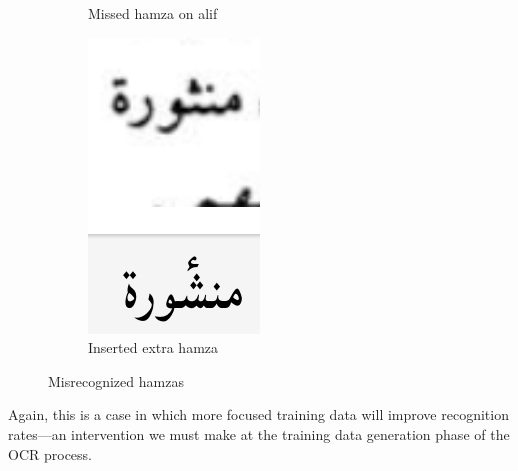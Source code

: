 \begin{figure}[!ht]
\begin{subfigure}[b]{0.3\linewidth}
	\caption{Missed hamza on alif}
	\label{fig3:fig19}
	\end{subfigure}
	\begin{subfigure}[b]{0.3\linewidth}
	\centering
	\includegraphics[width=\textwidth]{images/image30.png}
	\caption{Inserted extra hamza}
	\label{fig3:fig20}
	\end{subfigure}
	\caption{Misrecognized hamzas}
	\label{fig3:fig1820}
\end{figure}

Again, this is a case in which more focused training data will improve
recognition rates—an intervention we must make at the training data generation
phase of the OCR process.  


